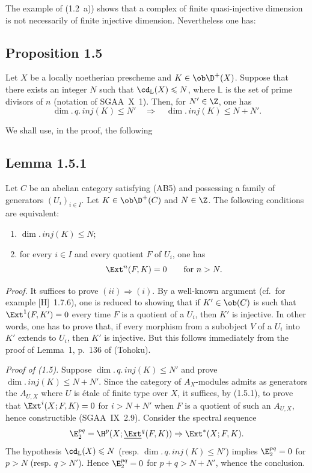 The example of (1.2~a)) shows that a complex of finite quasi-injective dimension is not necessarily of finite injective dimension. Nevertheless one has:

\subsection*{Proposition 1.5}
Let $X$ be a locally noetherian prescheme and $K \in \ob \D^{+}(X)$. Suppose that there exists an integer $N$ such that $\cd_{\mathbb{L}}(X) \leqslant N$, where $\mathbb{L}$ is the set of prime divisors of $n$ (notation of SGAA~X~1). Then, for $N' \in \Z$, one has
\[
\dim.\,q.\,inj(K) \leqslant N' \quad \Longrightarrow \quad \dim.\,inj(K) \leqslant N + N'.
\]

We shall use, in the proof, the following

\subsection*{Lemma 1.5.1}
Let $C$ be an abelian category satisfying (AB5) and possessing a family of generators $(U_i)_{i \in I}$. Let $K \in \ob \D^{+}(C)$ and $N \in \Z$. The following conditions are equivalent:
\begin{enumerate}[label=(\roman*)]
\item $\dim.\,inj(K) \leqslant N$;
\item for every $i \in I$ and every quotient $F$ of $U_i$, one has
\[
\Ext^n(F,K) = 0 \qquad \text{for } n > N.
\]
\end{enumerate}

\emph{Proof.} It suffices to prove $(ii) \Rightarrow (i)$. By a well-known argument (cf.\ for example [H]~1.7.6), one is reduced to showing that if $K' \in \ob(C)$ is such that $\Ext^1(F,K') = 0$ every time $F$ is a quotient of a $U_i$, then $K'$ is injective. In other words, one has to prove that, if every morphism from a subobject $V$ of a $U_i$ into $K'$ extends to $U_i$, then $K'$ is injective. But this follows immediately from the proof of Lemma~1, p.~136 of (Tohoku).

\emph{Proof of (1.5).} Suppose $\dim.\,q.\,inj(K) \leqslant N'$ and prove $\dim.\,inj(K) \leqslant N + N'$. Since the category of $A_X$-modules admits as generators the $A_{U,X}$ where $U$ is étale of finite type over $X$, it suffices, by (1.5.1), to prove that $\Ext^i(X; F,K) = 0$ for $i > N + N'$ when $F$ is a quotient of such an $A_{U,X}$, hence constructible (SGAA~IX~2.9). Consider the spectral sequence
\[
\E_2^{pq} = \H^p(X; \underline{\Ext}^q(F,K)) \Rightarrow \Ext^{*}(X; F,K).
\]
The hypothesis $\cd_{\mathbb{L}}(X) \leqslant N$ (resp. $\dim.\,q.\,inj(K) \leqslant N'$) implies $\E_2^{pq} = 0$ for $p > N$ (resp. $q > N'$). Hence $\E_2^{pq} = 0$ for $p+q > N+N'$, whence the conclusion.

